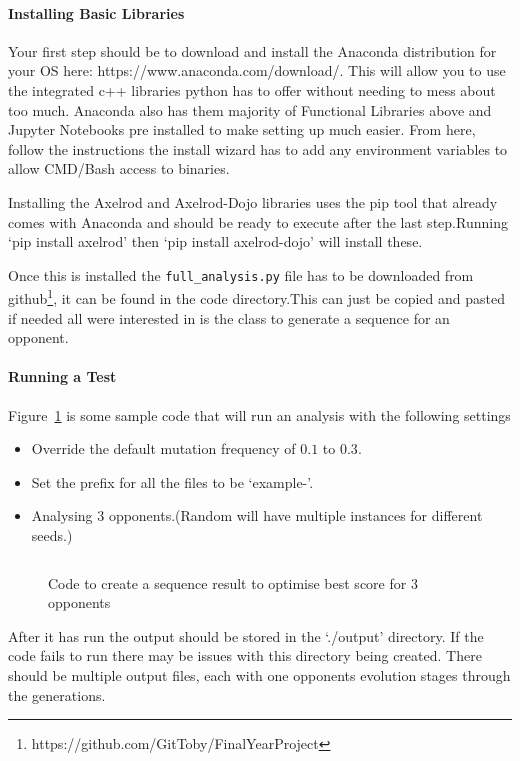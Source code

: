 \paragraph{Installing Basic Libraries}
Your first step should be to download and install the Anaconda distribution for your OS here: https://www.anaconda.com/download/.
This will allow you to use the integrated c++ libraries python has to offer without needing to mess about too much.
Anaconda also has them majority of Functional Libraries above and Jupyter Notebooks pre installed to make setting up much easier.
From here, follow the instructions the install wizard has to add any environment variables to allow CMD/Bash access to binaries.

Installing the Axelrod and Axelrod-Dojo libraries uses the pip tool that already comes with Anaconda and should be ready to execute after the last step.Running `pip install axelrod' then `pip install axelrod-dojo' will install these.

Once this is installed the \texttt{full\_analysis.py} file has to be downloaded from github\footnote{https://github.com/GitToby/FinalYearProject}, it can be found in the code directory.This can just be copied and pasted if needed all were interested in is the class to generate a sequence for an opponent.

\paragraph{Running a Test}
Figure~\ref{code:analysisExample} is some sample code that will run an analysis with the following settings
\begin{itemize}
    \item Override the default mutation frequency of \(0.1\) to \(0.3\).
    \item Set the prefix for all the files to be `example-'.
    \item Analysing 3 opponents.(Random will have multiple instances for different seeds.) 
\end{itemize}
\begin{figure}[ht]
    \centering
    \inputminted{python}{code_snippets/analysisExample.py}
    \caption{Code to create a sequence result to optimise best score for 3 opponents}\label{code:analysisExample}
\end{figure}

After it has run the output should be stored in the `./output' directory.
If the code fails to run there may be issues with this directory being created.
There should be multiple output files, each with one opponents evolution stages through the generations.

